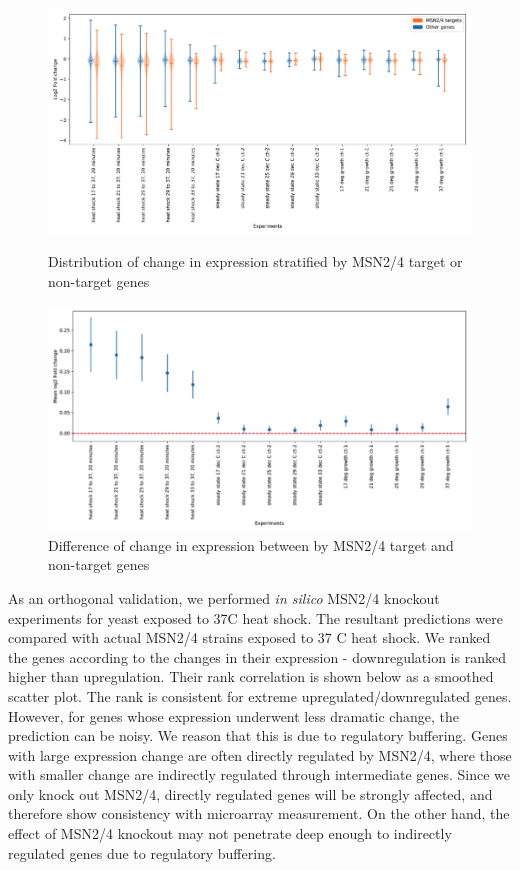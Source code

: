 \documentclass{article}
\begin{document}
\begin{figure}


\includegraphics[width=\textwidth]{fig/msn24_ko_target_genes_2.png}
\caption{Distribution of change in expression stratified by MSN2/4 target or non-target genes}
\label{msn24_ko_target_genes_2}


\includegraphics[width=\textwidth]{fig/msn24_ko_target_genes.png}
\caption{Difference of change in expression between by MSN2/4 target and non-target genes}
\label{msn24_ko_target_genes}

\end{figure}

As an orthogonal validation, we performed \textit{in silico} MSN2/4 knockout experiments for yeast exposed to 37C heat shock. The resultant predictions were compared with actual MSN2/4 strains exposed to 37 C heat shock. We ranked the genes according to the changes in their expression - downregulation is ranked higher than upregulation. Their rank correlation is shown below as a smoothed scatter plot. The rank is consistent for extreme upregulated/downregulated genes. However, for genes whose expression underwent less dramatic change, the prediction can be noisy. We reason that this is due to regulatory buffering. Genes with large expression change are often directly regulated by MSN2/4, where those with smaller change are indirectly regulated through intermediate genes. Since we only knock out MSN2/4, directly regulated genes will be strongly affected, and therefore show consistency with microarray measurement. On the other hand, the effect of MSN2/4 knockout may not penetrate deep enough to indirectly regulated genes due to regulatory buffering. 
\end{document}
